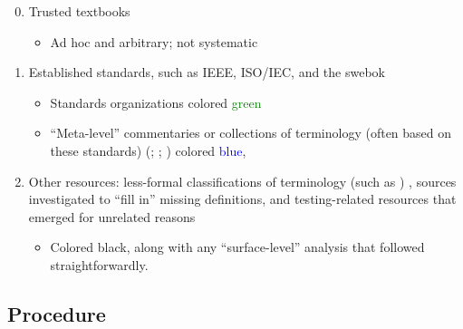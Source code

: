 \begin{enumerate}
    \setcounter{enumi}{-1}
    \item Trusted textbooks
          \citep{Patton2006, PetersAndPedrycz2000, vanVliet2000}
          \begin{itemize}
              \item Ad hoc and arbitrary; not systematic
          \end{itemize}
    \item Established standards, such as IEEE, ISO/IEC, and the \acf{swebok}
          \begin{itemize}
              \item Standards organizations \citep{IEEE2022, IEEE2017,
                        IEEE2013, ISO_IEC2023b, IEEE2012, ISO_IEC2023a,
                        IEEE2021, ISO_IEC2018, ISO2021, ISO2015}
                    colored \textcolor{green}{green}
              \item ``Meta-level'' commentaries or collections of
                    terminology (often based on these standards)
                    \ifnotpaper
                        (\citealp{SWEBOK2024, SWEBOK2014};
                        \citealpISTQB{}; \citealp{Firesmith2015})
                    \else
                        \cite{SWEBOK2024, SWEBOK2014, ISTQB, Firesmith2015}
                    \fi colored \textcolor{blue}{blue},
          \end{itemize}
    \item Other resources: less-formal classifications of terminology
          \ifnotpaper
              \citep[e.g.,][]{KuļešovsEtAl2013}%
          \else
              (such as \citep{KuļešovsEtAl2013})%
          \fi%
          , sources investigated to
          ``fill in'' missing definitions,
          and testing-related resources that emerged for unrelated reasons
          \begin{itemize}
              \item Colored black, along with any ``surface-level''
                    analysis that followed straightforwardly.
          \end{itemize}
\end{enumerate}

\subsection{Procedure}


